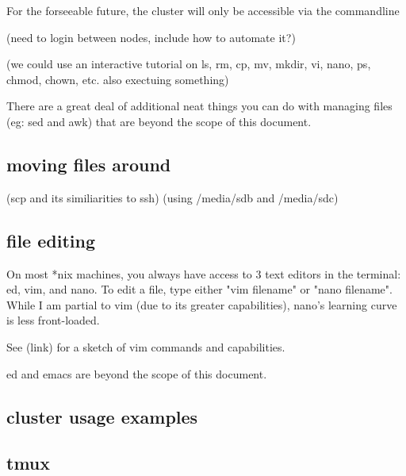 \documentclass[11pt]{article}
\begin{document}
For the forseeable future, the cluster will only be accessible via the commandline

(need to login between nodes, include how to automate it?)

(we could use an interactive tutorial on ls, rm, cp, mv, mkdir, vi, nano, ps, chmod, chown, etc. also exectuing something)

There are a great deal of additional neat things you can do with managing files (eg: sed and awk) that are beyond the scope of this document.

\subsection{moving files around}
(scp and its similiarities to ssh)
(using /media/sdb and /media/sdc)

\subsection{file editing}
On most *nix machines, you always have access to 3 text editors in the terminal: ed, vim, and nano.
To edit a file, type either "vim filename" or "nano filename". While I am partial to vim (due to its greater capabilities), nano's learning curve is less front-loaded.

See (link) for a sketch of vim commands and capabilities.

ed and emacs are beyond the scope of this document.

\subsection{cluster usage examples}

\subsection{tmux}
\end{document}
